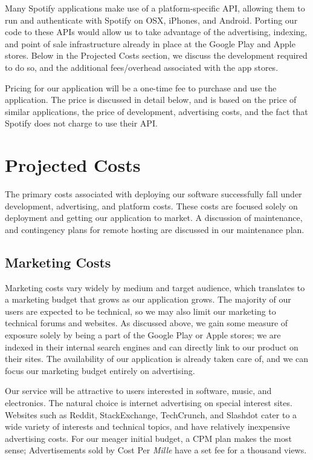 \documentclass{roffin}
\begin{document}
Many Spotify applications make use of a platform-specific API, allowing them to run and authenticate with Spotify on OSX, iPhones, and Android.  Porting our code to these APIs would allow us to take advantage of the advertising, indexing, and point of sale infrastructure already in place at the Google Play and Apple stores.  Below in the Projected Costs section, we discuss the development required to do so, and the additional fees/overhead associated with the app stores.

Pricing for our application will be a one-time fee to purchase and use the application.  The price is discussed in detail below, and is based on the price of similar applications, the price of development, advertising costs, and the fact that Spotify does not charge to use their API.


\section{Projected Costs} 

The primary costs associated with deploying our software successfully fall under development, advertising, and platform costs.  These costs are focused solely on deployment and getting our application to market.  A discussion of maintenance, and contingency plans for remote hosting are discussed in our maintenance plan.  

\subsection{Marketing Costs}
Marketing costs vary widely by medium and target audience, which translates to a marketing budget that grows as our application grows.  The majority of our users are expected to be technical, so we may also limit our marketing to technical forums and websites.  As discussed above, we gain some measure of exposure solely by being a part of the Google Play or Apple stores; we are indexed in their internal search engines and can directly link to our product on their sites.  The availability of our application is already taken care of, and we can focus our marketing budget entirely on advertising.

Our service will be attractive to users interested in software, music, and electronics.  The natural choice is internet advertising on special interest sites.  Websites such as Reddit, StackExchange, TechCrunch, and Slashdot cater to a wide variety of interests and technical topics, and have relatively inexpensive advertising costs.  For our meager initial budget, a CPM plan makes the most sense; Advertisements sold by Cost Per \textit{Mille} have a set fee for a thousand views.
\end{document}
